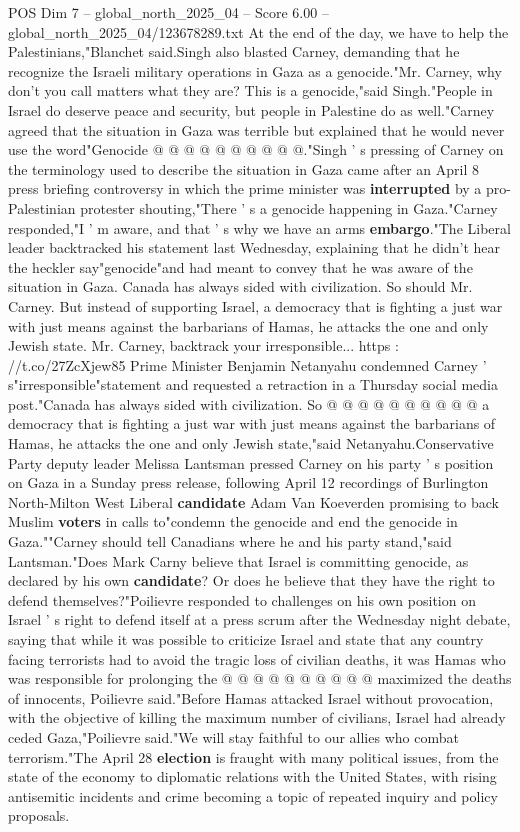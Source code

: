 \begin{textsample}{POS Dim 7 – global\_north\_2025\_04 – Score 6.00 – global\_north\_2025\_04/123678289.txt}
At the end of the day, we have to help the Palestinians,"Blanchet said.Singh also blasted Carney, demanding that he recognize the Israeli military operations in Gaza as a genocide."Mr.
Carney, why don't you call matters what they are?
This is a genocide,"said Singh."People in Israel do deserve peace and security, but people in Palestine do as well."Carney agreed that the situation in Gaza was terrible but explained that he would never use the word"Genocide @ @ @ @ @ @ @ @ @ @."Singh ' s pressing of Carney on the terminology used to describe the situation in Gaza came after an April 8 press briefing controversy in which the prime minister was \textbf{interrupted} by a pro-Palestinian protester shouting,"There ' s a genocide happening in Gaza."Carney responded,"I ' m aware, and that ' s why we have an arms \textbf{embargo}."The Liberal leader backtracked his statement last Wednesday, explaining that he didn't hear the heckler say"genocide"and had meant to convey that he was aware of the situation in Gaza.
Canada has always sided with civilization.
So should Mr.
Carney.
But instead of supporting Israel, a democracy that is fighting a just war with just means against the barbarians of Hamas, he attacks the one and only Jewish state.
Mr.
Carney, backtrack your irresponsible... https : //t.co/27ZcXjew85 Prime Minister Benjamin Netanyahu condemned Carney ' s"irresponsible"statement and requested a retraction in a Thursday social media post."Canada has always sided with civilization.
So @ @ @ @ @ @ @ @ @ @ a democracy that is fighting a just war with just means against the barbarians of Hamas, he attacks the one and only Jewish state,"said Netanyahu.Conservative Party deputy leader Melissa Lantsman pressed Carney on his party ' s position on Gaza in a Sunday press release, following April 12 recordings of Burlington North-Milton West Liberal \textbf{candidate} Adam Van Koeverden promising to back Muslim \textbf{voters} in calls to"condemn the genocide and end the genocide in Gaza.""Carney should tell Canadians where he and his party stand,"said Lantsman."Does Mark Carny believe that Israel is committing genocide, as declared by his own \textbf{candidate}?
Or does he believe that they have the right to defend themselves?"Poilievre responded to challenges on his own position on Israel ' s right to defend itself at a press scrum after the Wednesday night debate, saying that while it was possible to criticize Israel and state that any country facing terrorists had to avoid the tragic loss of civilian deaths, it was Hamas who was responsible for prolonging the @ @ @ @ @ @ @ @ @ @ maximized the deaths of innocents, Poilievre said."Before Hamas attacked Israel without provocation, with the objective of killing the maximum number of civilians, Israel had already ceded Gaza,"Poilievre said."We will stay faithful to our allies who combat terrorism."The April 28 \textbf{election} is fraught with many political issues, from the state of the economy to diplomatic relations with the United States, with rising antisemitic incidents and crime becoming a topic of repeated inquiry and policy proposals.

\end{textsample}
